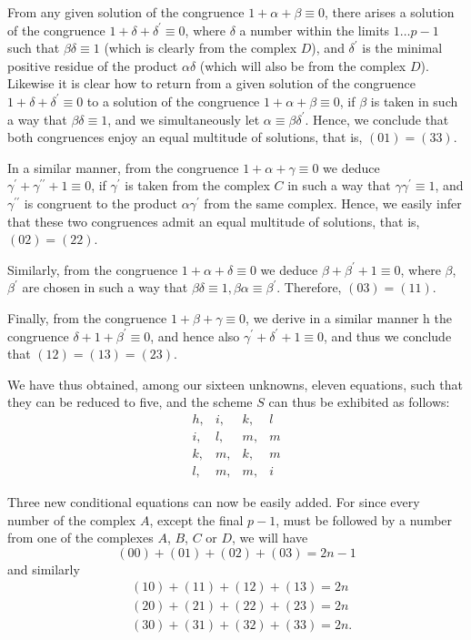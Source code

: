 \documentclass[twoside,12pt]{memoir}
\begin{document}
From any given solution of the congruence \(1+\alpha+\beta \equiv 0\), there arises a solution of the congruence \(1+\delta+\delta^{\prime} \equiv 0\), where \(\delta\) a number within the limits \(1 \ldots p-1\) such that \(\beta \delta \equiv 1\) (which is clearly from the complex \(D\)), and \(\delta^{\prime}\) is the minimal positive residue of the product \(\alpha \delta\) (which will also be from the complex \(D\)). Likewise it is clear how to return from a given solution of the congruence \(1+\delta+\delta^{\prime} \equiv 0\) to a solution of the congruence \(1+\alpha+\beta \equiv 0\), if \(\beta\) is taken in such a way that \(\beta \delta \equiv 1\), and we simultaneously let \(\alpha \equiv \beta \delta^{\prime}\). Hence, we conclude that both congruences enjoy an equal multitude of solutions, that is, \((01) = (33)\).

In a similar manner, from the congruence \(1+\alpha+\gamma \equiv 0\) we deduce \(\gamma^{\prime}+\gamma^{\prime \prime}+1 \equiv 0\), if \(\gamma^{\prime}\) is taken from the complex \(C\) in such a way that \(\gamma \gamma^{\prime} \equiv 1\), and \(\gamma^{\prime \prime}\) is congruent to the product \(\alpha \gamma^{\prime}\) from the same complex. Hence, we easily infer that these two congruences admit an equal multitude of solutions, that is, \((02) = (22)\).

Similarly, from the congruence \(1+\alpha+\delta \equiv 0\) we deduce \(\beta+\beta^{\prime}+1 \equiv 0\), where \(\beta\), \(\beta^{\prime}\) are chosen in such a way that \(\beta \delta \equiv 1, \beta \alpha \equiv \beta^{\prime}\). Therefore, \((03) = (11)\).

Finally, from the congruence \(1+\beta+\gamma \equiv 0\), we derive in a similar manner h the congruence \(\delta+1+\beta^{\prime} \equiv 0\), and hence also \(\gamma^{\prime}+\delta^{\prime}+1 \equiv 0\), and thus we conclude that \((12) = (13) = (23)\).

We have thus obtained, among our sixteen unknowns, eleven equations, such that they can be reduced to five, and the scheme \(S\) can thus be exhibited as follows:
\[\begin{array}{llll}
h, & i, & k, & l \\
i, & l, & m, & m \\
k, & m, & k, & m \\
l, & m, & m, & i
\end{array}\]
%

Three new conditional equations can now be easily added. For since every number of the complex \(A\), except the final \(p-1\), must be followed by a number from one of the complexes \(A\), \(B\), \(C\) or \(D\), we will have
\[(00)+(01)+(02)+(03)=2n-1\]
and similarly
\[\begin{aligned}
&(10)+(11)+(12)+(13)=2n \\
&(20)+(21)+(22)+(23)=2n \\
&(30)+(31)+(32)+(33)=2n.
\end{aligned}\]
\end{document}
